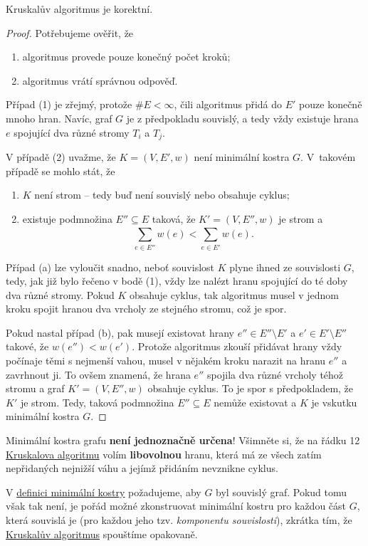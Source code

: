 \begin{claim}
 \label{claim:kruskal-korektni}
 Kruskalův algoritmus je korektní.
\end{claim}
\begin{proof}
 Potřebujeme ověřit, že
 \begin{enumerate}
  \item algoritmus provede pouze konečný počet kroků;
  \item algoritmus vrátí správnou odpověď.
 \end{enumerate}
 Případ (1) je zřejmý, protože $\# E < \infty$, čili algoritmus přidá do $E'$
 pouze konečně mnoho hran. Navíc, graf $G$ je z předpokladu souvislý, a tedy
 vždy existuje hrana $e$ spojující dva různé stromy $T_i$ a $T_j$.

 V případě (2) uvažme, že $K = (V,E',w)$ není minimální kostra $G$. V~takovém
 případě se mohlo stát, že
 \begin{enumerate}[label=(\alph*)]
  \item $K$ není strom -- tedy buď není souvislý nebo obsahuje cyklus;
  \item existuje podmnožina $E'' \subseteq E$ taková, že $K' = (V,E'',w)$ je strom a
   \[
    \sum_{e \in E''}^{} w(e) < \sum_{e \in E'}^{} w(e).
   \]
 \end{enumerate}
 Případ (a) lze vyloučit snadno, neboť souvislost $K$ plyne ihned ze
 souvislosti $G$, tedy, jak již bylo řečeno v bodě (1), vždy lze nalézt hranu
 spojující do té doby dva různé stromy. Pokud $K$ obsahuje cyklus, tak
 algoritmus musel v jednom kroku spojit hranou dva vrcholy ze stejného stromu,
 což je spor.

 Pokud nastal případ (b), pak musejí existovat hrany $e'' \in E'' \setminus E'$
 a $e' \in E' \setminus E''$ takové, že $w(e'') < w(e')$. Protože algoritmus
 zkouší přidávat hrany vždy počínaje těmi s nejmenší vahou, musel v nějakém
 kroku narazit na hranu $e''$ a zavrhnout ji. To ovšem znamená, že hrana $e''$ 
 spojila dva různé vrcholy téhož stromu a graf $K' = (V,E'',w)$ obsahuje
 cyklus. To je spor s předpokladem, že $K'$ je strom. Tedy, taková podmnožina
 $E'' \subseteq E$ nemůže existovat a $K$ je vskutku minimální kostra $G$.
\end{proof}

\begin{warning}
 Minimální kostra grafu \textbf{není jednoznačně určena}! Všimněte si, že na
 řádku 12 \hyperref[alg:kruskal]{Kruskalova algoritmu} volím
 \textbf{libovolnou} hranu, která má ze všech zatím nepřidaných nejnižší váhu a
 jejímž přidáním nevznikne cyklus.
\end{warning}

\begin{remark}
 V \hyperref[def:minimalni-kostra]{definici minimální kostry} požadujeme, aby
 $G$ byl souvislý graf. Pokud tomu však tak není, je pořád možné zkonstruovat
 minimální kostru pro každou část $G$, která souvislá je (pro každou jeho tzv.
 \emph{komponentu souvislosti}), zkrátka tím, že
 \hyperref[alg:kruskal]{Kruskalův algoritmus} spouštíme opakovaně.
\end{remark}
